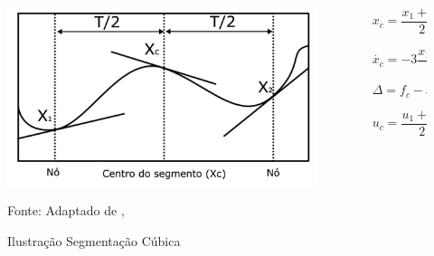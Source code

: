 \documentclass[aspectratio=169]{beamer}
\begin{document}
\begin{frame}
  \frametitle{\insertsubsection}

  \begin{columns}
    \begin{column}{.6\textwidth}
      \begin{figure}[H]
        \centering
        \caption{Ilustração Segmentação Cúbica}
        \includegraphics[width=1\textwidth]{hargraves_func}
    
        {\footnotesize Fonte: Adaptado de \citeauthor{hargraves87}, \citeyear{hargraves87}}
        \label{fig:hargraves_fun}
      \end{figure}
    \end{column}
    \begin{column}{.45\textwidth}
      \begin{equation}
        \label{eq:state_center_segment}
        x_c = \frac{x_{1} + x_{2}}{2} + T\frac{f_{1} - f_{2}}{8}
      \end{equation}
    
      \begin{equation}
        \label{eq:state_dot_center_segment}
        \dot{x_{c}} = -3\frac{x_{1} + x_{2}}{2T} + \frac{f_{1} + f_{2}}{4}
      \end{equation}
    
      \begin{equation}
        \label{eq:defect_calc}
        \Delta = f_c - \dot{x_c}
      \end{equation}
    
      \begin{equation}
        \label{eq:input_value_center_segment}
        u_c = \frac{u_1 + u_2}{2}
      \end{equation}
    \end{column}
  \end{columns}
\end{frame}
\end{document}
